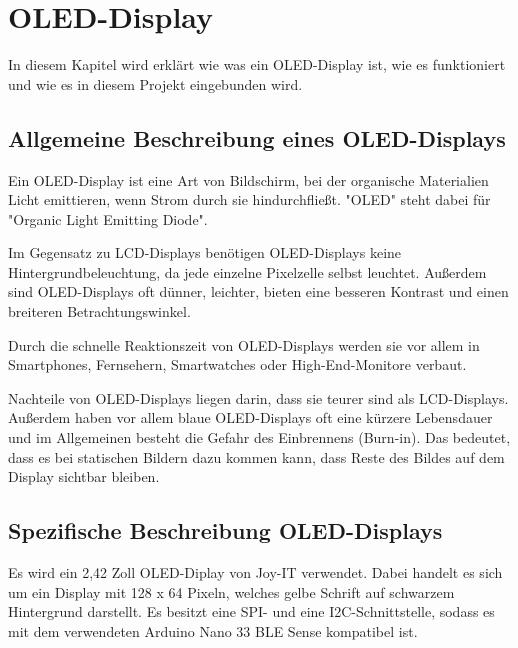 %
%

\chapter{OLED-Display }

In diesem Kapitel wird erklärt wie was ein OLED-Display ist, wie es funktioniert und wie es in diesem Projekt eingebunden wird.

\section{Allgemeine Beschreibung eines OLED-Displays}

Ein OLED-Display ist eine Art von Bildschirm, bei der organische Materialien Licht emittieren, wenn Strom durch sie hindurchfließt. "OLED" steht dabei für "Organic Light Emitting Diode".

Im Gegensatz zu LCD-Displays benötigen OLED-Displays keine Hintergrundbeleuchtung, da jede einzelne Pixelzelle selbst leuchtet. Außerdem sind OLED-Displays oft dünner, leichter, bieten eine besseren Kontrast und einen breiteren Betrachtungswinkel. 

Durch die schnelle Reaktionszeit von OLED-Displays werden sie vor allem in Smartphones, Fernsehern, Smartwatches oder High-End-Monitore verbaut. 

Nachteile von OLED-Displays liegen darin, dass sie teurer sind als LCD-Displays. Außerdem haben vor allem blaue OLED-Displays oft eine kürzere Lebensdauer und im Allgemeinen besteht die Gefahr des Einbrennens (Burn-in). Das bedeutet, dass es bei statischen Bildern dazu kommen kann, dass Reste des Bildes auf dem Display sichtbar bleiben. 

\section{Spezifische Beschreibung OLED-Displays}

Es wird ein 2,42 Zoll OLED-Diplay von Joy-IT verwendet. Dabei handelt es sich um ein Display mit 128 x 64 Pixeln, welches gelbe Schrift auf schwarzem Hintergrund darstellt. Es besitzt eine SPI- und eine I2C-Schnittstelle, sodass es mit dem verwendeten Arduino Nano 33 BLE Sense kompatibel ist. 

